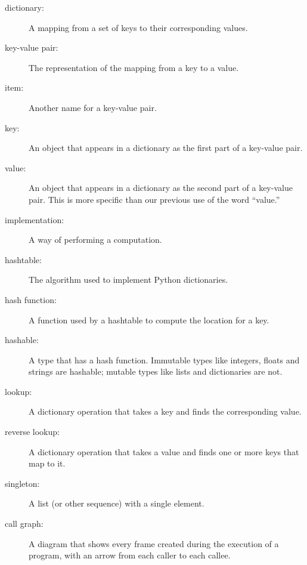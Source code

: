 \documentclass[10pt]{book}
\begin{document}
\begin{description}

\item[dictionary:] A mapping from a set of keys to their
corresponding values.

\item[key-value pair:] The representation of the mapping from
a key to a value.

\item[item:] Another name for a key-value pair.

\item[key:] An object that appears in a dictionary as the
first part of a key-value pair.

\item[value:] An object that appears in a dictionary as the
second part of a key-value pair.  This is more specific than
our previous use of the word ``value.''

\item[implementation:] A way of performing a computation.

\item[hashtable:] The algorithm used to implement Python
dictionaries.

\item[hash function:] A function used by a hashtable to compute the
location for a key.

\item[hashable:] A type that has a hash function.  Immutable
types like integers,
floats and strings are hashable; mutable types like lists and
dictionaries are not.

\item[lookup:] A dictionary operation that takes a key and finds
the corresponding value.

\item[reverse lookup:] A dictionary operation that takes a value and finds
one or more keys that map to it.

\item[singleton:] A list (or other sequence) with a single element.

\item[call graph:] A diagram that shows every frame created during
the execution of a program, with an arrow from each caller to
each callee. 


\end{description}
\end{document}
